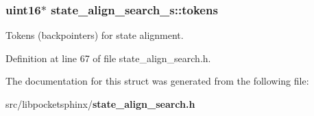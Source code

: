 \subsubsection[{tokens}]{\setlength{\rightskip}{0pt plus 5cm}uint16$\ast$ state\+\_\+align\+\_\+search\+\_\+s\+::tokens}\label{structstate__align__search__s_ab4b6f67b07b2e9d48a0af31474c5e29b}


Tokens (backpointers) for state alignment. 



Definition at line 67 of file state\+\_\+align\+\_\+search.\+h.



The documentation for this struct was generated from the following file\+:\begin{DoxyCompactItemize}
\item 
src/libpocketsphinx/{\bf state\+\_\+align\+\_\+search.\+h}\end{DoxyCompactItemize}

